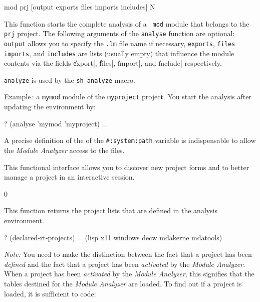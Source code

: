  {mod prj [output exports files imports includes]} {N}

This function starts the complete analysis of a {\tt
mod} module that belongs to the {\tt prj} project.  The following arguments of the {\tt analyse} function are optional:
{\tt output} allows you to specify the {\tt .lm} file name if necessary, {\tt exports}, {\tt files}
{\tt imports}, and {\tt includes} are lists (usually empty) that influence the module contents via the fields \|export|,
\|files|, \|import|, and \|include| respectively.

\NoIndent
{\tt analyze} is used by the {\tt sh-analyze} macro.

Example\,: a {\tt mymod} module of the {\tt myproject} project.
You start the analysis after updating the environment by:

\begin{Code*}
? (analyse 'mymod 'myproject)
 ...
\end{Code*}

A precise definition of the of the {\tt \#:system:path} variable is indispensable to allow the {\em Module Analyzer} access to the files. 

This functional interface allows you to discover new project forms and to better manage a project in an interactive session.

 {}{0}

This function returns the project lists that are defined in the analysis environment. 

\begin{Code*}
? (declared-rt-projects)
= (lisp x11 windows decw mdakerne mdatools)
\end{Code*}

{\em Note:} You need to make the distinction between the fact that a project has been {\it defined} and the fact that a project has been {\it activated} by the {\em Module Analyzer}.
When a project has been {\it activated} by the
{\em Module Analyzer}, this signifies that the tables destined for the {\em Module Analyzer} are loaded.
To find out if a project is loaded, it is sufficient to code:


